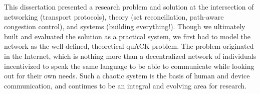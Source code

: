 This dissertation presented a research problem and solution at the intersection
of networking (transport protocols), theory (set reconciliation, path-aware
congestion control), and systems (building everything!). Though we ultimately
built and evaluated the solution as a practical system, we first had to model
the network as the well-defined, theoretical quACK problem. The problem
originated in the Internet, which is nothing more than a decentralized network
of individuals incentivized to speak the same language to be able to
communicate while looking out for their own needs. Such a chaotic system is the
basis of human and device communication, and continues to be an integral and
evolving area for research.
